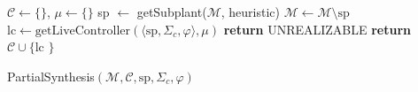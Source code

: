 \makeatletter
\renewcommand{\fnum@algorithm}{} %
\makeatother
\noindent

\vspace{-0.75cm}
\noindent
\begin{minipage}[t]{0.48\textwidth} %
\begin{algorithm}[H]
\scriptsize
\caption{\scriptsize{\textbf{CompSynthesis}($\langle \mathcal{M}, \varphi, \Sigma_c \rangle$, heuristic)}}
\begin{algorithmic}[1]
\STATE $\mathcal{C} \gets \{\}$, $\mu \gets \{\}$
\STATE sp $\gets$ getSubplant($\mathcal{M}$, heuristic) 
\STATE $\mathcal{M} \gets \mathcal{M} \setminus \text{sp}$
\STATE $\text{lc} \gets \text{getLiveController}(\langle \text{sp}, \Sigma_c, \varphi \rangle, \mu)$ 
\STATE \textbf{return} UNREALIZABLE
\ENDIF
\STATE \textbf{return} $\mathcal{C} \cup \text{\{ lc \}}$
\ENDIF

\STATE PartialSynthesis$(\mathcal{M}, \mathcal{C},  \text{sp}, \Sigma_c, \varphi)$

\ENDWHILE
\end{algorithmic}
\end{algorithm}
\end{minipage}
\hspace{0.0\textwidth} %
